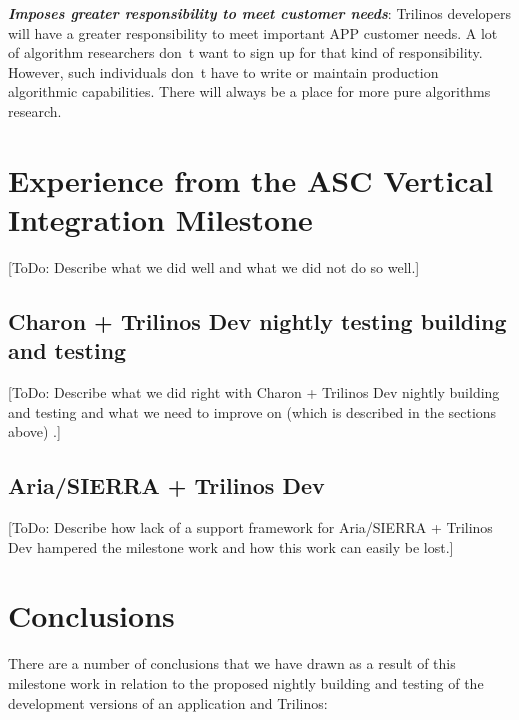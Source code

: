 \documentclass[pdf,ps2pdf,11pt]{SANDreport}
\begin{document}
{}\textit{\textbf{Imposes greater responsibility to meet customer needs}}:
Trilinos developers will have a greater responsibility to meet important APP
customer needs.  A lot of algorithm researchers don~t want to sign up for that
kind of responsibility.  However, such individuals don~t have to write or
maintain production algorithmic capabilities.  There will always be a place
for more pure algorithms research.


%
\section{Experience from the ASC Vertical Integration Milestone}
%

[ToDo: Describe what we did well and what we did not do so well.]


%
\subsection{Charon + Trilinos Dev nightly testing building and testing}
%

[ToDo: Describe what we did right with Charon + Trilinos Dev nightly building
and testing and what we need to improve on (which is described in the sections
above) .]


%
\subsection{Aria/SIERRA + Trilinos Dev}
%

[ToDo: Describe how lack of a support framework for Aria/SIERRA + Trilinos Dev
hampered the milestone work and how this work can easily be lost.]


%
\section{Conclusions}
%

There are a number of conclusions that we have drawn as a result of this
milestone work in relation to the proposed nightly building and testing of the
development versions of an application and Trilinos:
\end{document}
